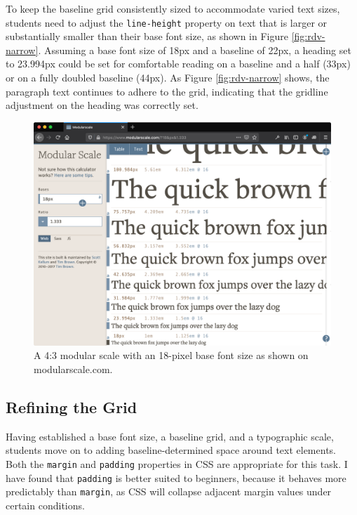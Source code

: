 \documentclass[sigplan,screen]{acmart}
\begin{document}
To keep the baseline grid consistently sized to accommodate varied text sizes, students need to adjust the \verb|line-height| property on text that is larger or substantially smaller than their base font size, as shown in Figure \ref{fig:rdv-narrow}. Assuming a base font size of 18px and a baseline of 22px, a heading set to 23.994px could be set for comfortable reading on a baseline and a half (33px) or on a fully doubled baseline (44px). As Figure \ref{fig:rdv-narrow} shows, the paragraph text continues to adhere to the grid, indicating that the gridline adjustment on the heading was correctly set.

\begin{figure}
  \includegraphics[width=\linewidth]{modular-scale}
  \caption{A 4:3 modular scale with an 18-pixel base font size as shown on modularscale.com.}
  \label{fig:modscale}
\end{figure}


\subsection{Refining the Grid}

Having established a base font size, a baseline grid, and a typographic scale, students move on to adding baseline-determined space around text elements. Both the \verb|margin| and \verb|padding| properties in CSS are appropriate for this task. I have found that \verb|padding| is better suited to beginners, because it behaves more predictably than \verb|margin|, as CSS will collapse adjacent margin values under certain conditions.
\end{document}
